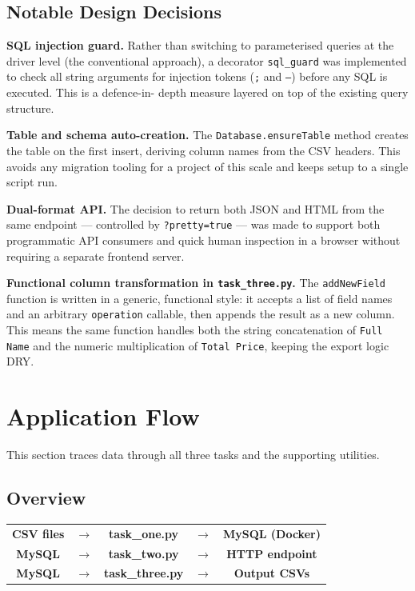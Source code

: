 \documentclass[12pt,a4paper]{article}
\begin{document}
\subsection{Notable Design Decisions}

\textbf{SQL injection guard.} Rather than switching to parameterised queries
at the driver level (the conventional approach), a decorator \texttt{sql\_guard}
was implemented to check all string arguments for injection tokens
(\texttt{;} and \texttt{--}) before any SQL is executed. This is a defence-in-
depth measure layered on top of the existing query structure.

\textbf{Table and schema auto-creation.} The \texttt{Database.ensureTable}
method creates the table on the first insert, deriving column names from the
CSV headers. This avoids any migration tooling for a project of this scale and
keeps setup to a single script run.

\textbf{Dual-format API.} The decision to return both JSON and HTML from the
same endpoint --- controlled by \texttt{?pretty=true} --- was made to support
both programmatic API consumers and quick human inspection in a browser without
requiring a separate frontend server.

\textbf{Functional column transformation in \texttt{task\_three.py}.} The
\texttt{addNewField} function is written in a generic, functional style: it
accepts a list of field names and an arbitrary \texttt{operation} callable,
then appends the result as a new column. This means the same function handles
both the string concatenation of \texttt{Full Name} and the numeric
multiplication of \texttt{Total Price}, keeping the export logic DRY.

\section{Application Flow}

This section traces data through all three tasks and the supporting utilities.

\subsection{Overview}

\begin{center}
\begin{tabular}{ccccc}
\textbf{CSV files} & $\rightarrow$ & \textbf{task\_one.py} & $\rightarrow$ & \textbf{MySQL (Docker)} \\[0.4em]
\textbf{MySQL} & $\rightarrow$ & \textbf{task\_two.py} & $\rightarrow$ & \textbf{HTTP endpoint} \\[0.4em]
\textbf{MySQL} & $\rightarrow$ & \textbf{task\_three.py} & $\rightarrow$ & \textbf{Output CSVs} \\
\end{tabular}
\end{center}
\end{document}
